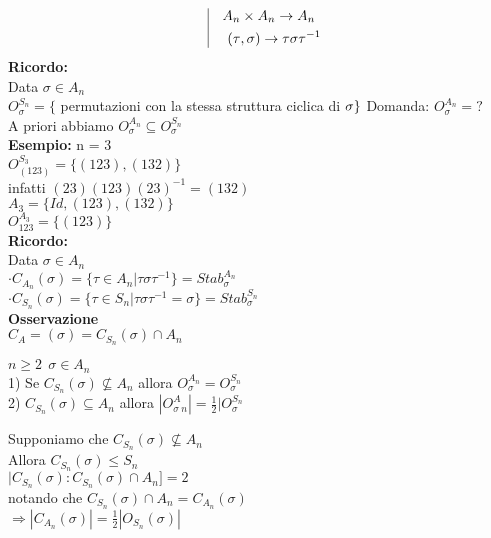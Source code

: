 \documentclass[12px]{article}
\begin{document}
{\[\begin{aligned}
	   \end{aligned} \ \ 
	   \vline \ \ \ 
	   \begin{aligned}
		   A_n&\times A_n \rightarrow A_n\\
		   (\tau&,\sigma) \rightarrow\tau\sigma \tau^{-1}
	   \end{aligned}
   \]
   \textbf{Ricordo:}\\
   Data $\sigma\in A_n$\\
   $O_\sigma^{S_n} = \{$ permutazioni con la stessa struttura ciclica di $\sigma\}\\$
   Domanda:  $O_\sigma^{A_n} = ?$\\
   A priori abbiamo  $O_\sigma^{A_n}\subseteq O_\sigma^{S_n}$\\
    \textbf{Esempio:} n = 3\\
    $O^{S_3}_{(123)} = \{(123),(132)\}$\\
    infatti $(23)(123)(23)^{-1} = (132)$\\
    $A_3 = \{Id,(123),(132)\}$\\
    $O^{A_3}_{123} = \{(123)\}$\\
    \textbf{Ricordo:}\\
    Data $\sigma\in A_n$\\
    $\cdot C_{A_n}(\sigma) = \{\tau\in A_n|\tau\sigma\tau^{-1}\} = Stab^{A_n}_\sigma$\\
    $\cdot C_{S_n}(\sigma) = \{\tau\in S_n | \tau\sigma\tau^{-1} = \sigma\} = Stab_\sigma^{S_n}$\\
     \textbf{Osservazione}\\
     $C_A = (\sigma) = C_{S_n}(\sigma)\cap A_n$\\
      \begin{teo}
     	$n\geq 2 \ \ \sigma \in A_n$ \\
	1) Se $C_{S_n}(\sigma )\not\subseteq A_n$ allora $O_\sigma^{A_n} = O_\sigma^{S_n}$\\
	2) $C_{S_n}(\sigma)\subseteq A_n$ allora $|O_\sigma^A_n| = \frac 12 |O_\sigma^{S_n}$
\end{teo}
	 \begin{dimo}
		 Supponiamo che $C_{S_n}(\sigma)\not\subseteq A_n$\\
		 Allora  $C_{S_n}(\sigma)\leq S_n$\\
		 $|C_{S_n}(\sigma):C_{S_n}(\sigma)\cap A_n] = 2$\\
		 notando che $C_{S_n}(\sigma)\cap A_n = C_{A_n}(\sigma)$\\
		 $ \Rightarrow |C_{A_n}(\sigma)| = \frac 12 |O_{S_n}(\sigma)|$ \\

\end{dimo}}
\end{document}
